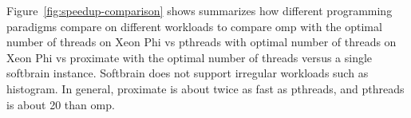 Figure~\ref{fig:speedup-comparison} shows summarizes how different programming 
paradigms compare on different workloads to compare omp with the optimal number 
of threads on Xeon Phi vs pthreads with optimal number of threads on Xeon Phi vs 
proximate with the optimal number of threads versus a single softbrain instance. 
Softbrain does not support irregular workloads such as histogram. In general, 
proximate is about twice as fast as pthreads, and pthreads is about 20%
than omp. 
